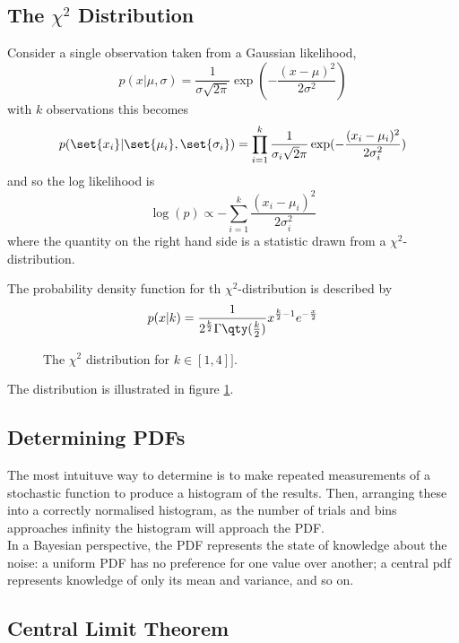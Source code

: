 \documentclass{dwnotes}         		        %
\begin{document}
\subsection{The $\chi^2$ Distribution}
\label{sec:chi2-distribution}

Consider a single observation taken from a Gaussian likelihood,
\[ p(x | \mu, \sigma) = \frac{1}{\sigma \sqrt{2 \pi}} \exp( -
\frac{(x-\mu)^2}{2 \sigma^2} ) \]
with $k$ observations this becomes
\[ p(\set{x_i} | \set{\mu_i}, \set{\sigma_i}) = \prod_{i=1}^k
\frac{1}{\sigma_i \sqrt{2}\pi} \exp( - \frac{(x_i - \mu_i)^2}{2
  \sigma_i^2} )\]
and so the log likelihood is
\[ \log(p) \propto - \sum_{i=1}^k \frac{(x_i - \mu_i)^2}{2
  \sigma_i^2} \] where the quantity on the right hand side is a
statistic drawn from a $\chi^2$-distribution.

\begin{definition}
  The probability density function for th $\chi^2$-distribution is described by
  \begin{equation}
    \label{eq:4}
    p(x | k) = \frac{1}{2^{\frac{k}{2}} \Gamma \qty (\frac{k}{2}) } x^{\frac{k}{2} -1} e^{- \frac{x}{2}} 
  \end{equation}
\end{definition}

\begin{figure}
  \centering
  
  \caption{The $\chi^2$ distribution for $k \in [1,4]]$.}
  \label{fig:chisquareddistropdf}
\end{figure}
The distribution is illustrated in figure
\ref{fig:chisquareddistropdf}. 

\subsection{Determining PDFs}
\label{sec:determinepdf}

The most intuituve way to determine is to make repeated measurements
of a stochastic function to produce a histogram of the results. Then,
arranging these into a correctly normalised histogram, as the number
of trials and bins approaches infinity the histogram will approach the
PDF.\\
In a Bayesian perspective, the PDF represents the state of knowledge
about the noise: a uniform PDF has no preference for one value over
another; a central pdf represents knowledge of only its mean and
variance, and so on.

\subsection{Central Limit Theorem}
\label{sec:centrallimit}
\end{document}
